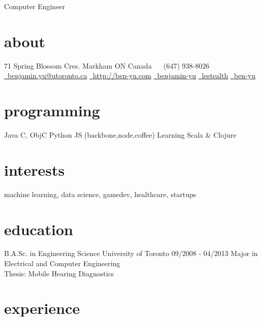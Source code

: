 \documentclass[]{friggeri-cv}
\begin{document}
       {Computer Engineer}


\begin{aside}
  \section{about}
    71 Spring Blossom Cres.
    Markham ON
    Canada
    ~
    \symbolfont\faPhone\bodyfont\ (647) 938-8026
    \href{mailto:benjamin.yu@utoronto.ca}{\symbolfont\faEnvelope\bodyfont\ benjamin.yu@utoronto.ca}
    \href{http://ben-yu.com}{\symbolfont\faGlobe \bodyfont\ http://ben-yu.com}
    \href{http://www.linkedin.com/pub/benjamin-yu/20/9b0/153}{\symbolfont{\faLinkedin} \bodyfont\ benjamin-yu}
    \href{http://twitter.com/lestealth}{\symbolfont\faTwitter \bodyfont\ lestealth}
    \href{https://github.com/ben-yu}{\symbolfont{\faGithub} \bodyfont\ ben-yu}
  \section{programming}
    Java
    C, ObjC
    Python
    JS
    (backbone,node,coffee)
    Learning Scala \& Clojure
\end{aside}

\section{interests}

machine learning, data science, gamedev, healthcare, startups

\section{education}

\begin{entrylist}
  \entry
    {B.A.Sc. in Engineering Science}
    {University of Toronto}
    {09/2008 - 04/2013}
    {Major in Electrical and Computer Engineering \\
     Thesis: Mobile Hearing Diagnostics}

\end{entrylist}

\section{experience}
\end{document}
